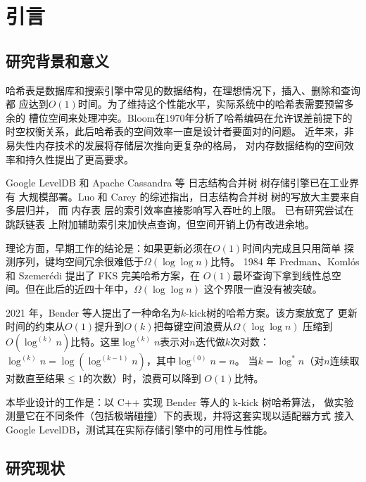 \documentclass[
    type = bachelor,
    fontset = win,
    decl-page = true,
  ]{njuthesis}
\begin{document}
\tableofcontents

\mainmatter
\let\cleardoublepage\clearpage

\chapter{引言}

\section{研究背景和意义}

哈希表是数据库和搜索引擎中常见的数据结构，在理想情况下，插入、删除和查询都
应达到$O(1)$时间。为了维持这个性能水平，实际系统中的哈希表需要预留多余的
槽位空间来处理冲突。Bloom\cite{16}在1970年分析了哈希编码在允许误差前提下的
时空权衡关系，此后哈希表的空间效率一直是设计者要面对的问题。
近年来，非易失性内存技术的发展\cite{19}将存储层次推向更复杂的格局，
对内存数据结构的空间效率和持久性提出了更高要求。

Google LevelDB\cite{2} 和 Apache Cassandra 等 日志结构合并树 树存储引擎已在工业界有
大规模部署\cite{13}。Luo 和 Carey 的综述指出，日志结构合并树 树的写放大主要来自多层归并，
而 内存表 层的索引效率直接影响写入吞吐的上限\cite{13}。
已有研究尝试在 跳跃链表 上附加辅助索引来加快点查询，但空间开销上仍有改进余地。

理论方面，早期工作\cite{3,10}的结论是：如果更新必须在$O(1)$时间内完成且只用简单
探测序列，键均空间冗余很难低于$\Omega(\log \log n)$比特。
1984 年 Fredman、Koml\'{o}s 和 Szemer\'{e}di 提出了 FKS 完美哈希方案\cite{10}，在
$O(1)$最坏查询下拿到线性总空间。但在此后的近四十年中，$\Omega(\log\log n)$
这个界限一直没有被突破\cite{1}。

2021 年，Bender 等人\cite{1}提出了一种命名为$k$-kick树的哈希方案。该方案放宽了
更新时间的约束从$O(1)$提升到$O(k)$把每键空间浪费从$\Omega(\log\log n)$
压缩到$O(\log^{(k)} n)$比特。这里$\log^{(k)} n$表示对$n$迭代做$k$次对数：
$\log^{(k)} n = \log(\log^{(k-1)} n)$，其中$\log^{(0)} n = n$。
当$k = \log^{*} n$（对$n$连续取对数直至结果$\le 1$的次数）时，浪费可以降到
$O(1)$比特。

本毕业设计的工作是：以 C++ 实现 Bender 等人的 k-kick 树哈希算法\cite{1}，
做实验测量它在不同条件（包括极端碰撞）下的表现，并将这套实现以适配器方式
接入 Google LevelDB，测试其在实际存储引擎中的可用性与性能。

\section{研究现状}
\end{document}
